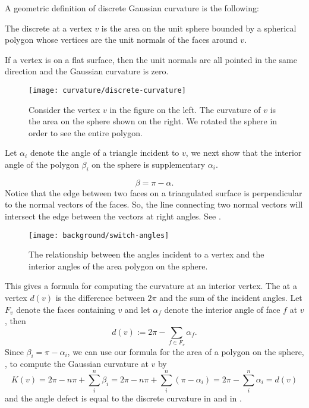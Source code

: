 A geometric definition of discrete Gaussian curvature is the following:
\begin{definition}\label{def:discrete-curvature-vertex}

The discrete  at a vertex $v$ is the area on the unit 
sphere bounded by a spherical polygon whose vertices are the unit normals of 
the faces around $v$.

\end{definition}

If a vertex is on a flat surface, then the unit normals are all pointed
in the same direction and the Gaussian curvature is zero.

\begin{figure}[htb]
\centering
\texttt{[image: curvature/discrete-curvature]}
\caption{Consider the vertex $v$ in the figure on the left. The curvature of $v$
is the area on the sphere shown on the right. We rotated the sphere
in order to see the entire polygon.}
\label{fig:discrete-curvature}
\end{figure}


Let $\alpha_i$ denote the angle of a triangle incident to $v$, 
we next show that the interior angle of the polygon $\beta_i$ on the 
sphere is supplementary $\alpha_i$.

\begin{equation} \label{eqn:switcheroo}
\beta=\pi-\alpha.
\end{equation}
Notice that the edge between two faces
on a triangulated surface
is perpendicular to the normal vectors of the faces.
So, the line connecting two normal vectors will intersect the edge between the vectors 
at right angles. See .


\begin{figure}[htb]
\centering
\texttt{[image: background/switch-angles]}
\caption{The relationship between the angles incident to a vertex and
the interior angles of the area polygon on the sphere.}
\label{fig:switcheroo}
\end{figure}



This gives a  formula for computing the curvature at an interior vertex.
The  at a vertex $d(v)$ is the difference between $2\pi$ and
the sum of the incident angles.  Let $F_v$ denote the faces containing $v$  
and let $\alpha_f$  denote the interior  angle of face $f$ at $v$, then
\begin{equation} \label{eqn:defect}
d(v):=2\pi -\sum_{f\in F_v}\alpha_f.
\end{equation}
Since $\beta_i=\pi-\alpha_i$,
we can use our formula for the area of a polygon on the sphere,
, to compute the Gaussian curvature at $v$
by
$$K(v)=2\pi -n\pi+\sum_{i}^n \beta_i=2\pi-n\pi +\sum_{i}^n (\pi-\alpha_i) =2\pi-\sum_i^n\alpha_i=d(v)$$
 and the
 angle defect is equal to the discrete curvature in 
 and in .







